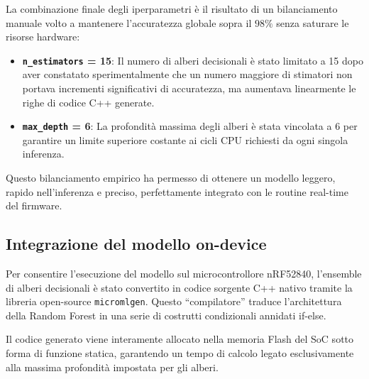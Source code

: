La combinazione finale degli iperparametri è il risultato di un bilanciamento manuale volto a mantenere l'accuratezza globale sopra il $98\%$ senza saturare le risorse hardware:

\begin{itemize}
    \item \textbf{\texttt{n\_estimators} = 15}: Il numero di alberi decisionali è stato limitato a 15 dopo aver constatato sperimentalmente che un numero maggiore di stimatori non portava incrementi significativi di accuratezza, ma aumentava linearmente le righe di codice C++ generate.
    \item \textbf{\texttt{max\_depth} = 6}: La profondità massima degli alberi è stata vincolata a 6 per garantire un limite superiore costante ai cicli CPU richiesti da ogni singola inferenza.
\end{itemize}

Questo bilanciamento empirico ha permesso di ottenere un modello leggero, rapido nell'inferenza e preciso, perfettamente integrato con le routine real-time del firmware.

\subsection{Integrazione del modello on-device}
Per consentire l'esecuzione del modello sul microcontrollore nRF52840, l'ensemble di alberi decisionali è stato convertito in codice sorgente C++ nativo tramite la libreria open-source \texttt{micromlgen}. Questo ``compilatore'' traduce l'architettura della Random Forest in una serie di costrutti condizionali annidati if-else.

Il codice generato viene interamente allocato nella memoria Flash del SoC sotto forma di funzione statica, garantendo un tempo di calcolo legato esclusivamente alla massima profondità impostata per gli alberi.